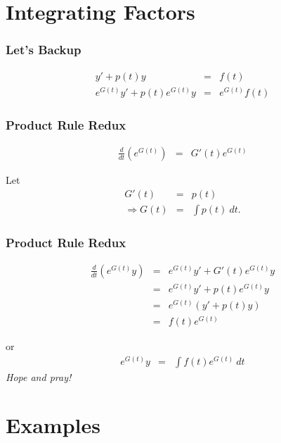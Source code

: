 \documentclass{beamer}
\newcommand{\lp}{\left(}
\newcommand{\rp}{\right)}
\begin{document}
\section{Integrating Factors}

\begin{frame}
  \frametitle{Let's Backup}

  \begin{eqnarray*}
    y' + p(t) y & = & f(t) \\
    e^{G(t)} y' + p(t) e^{G(t)} y & = & e^{G(t)} f(t)
  \end{eqnarray*}


\end{frame}



\begin{frame}
  \frametitle{Product Rule Redux}

  \begin{eqnarray*}
    \frac{d}{dt} \lp e^{G(t)} \rp & = & G'(t) e^{G(t)} 
  \end{eqnarray*}

  Let
  \begin{eqnarray*}
    G'(t) & = & p(t) \\
    \Rightarrow G(t) & = & \int p(t) ~ dt.
  \end{eqnarray*}


\end{frame}


\begin{frame}
  \frametitle{Product Rule Redux}

  \begin{eqnarray*}
    \frac{d}{dt} \lp e^{G(t)} y \rp & = & e^{G(t)} y' + G'(t) e^{G(t)} y \\
    & = & e^{G(t)} y' + p(t) e^{G(t)} y \\
    & = & e^{G(t)} \lp y' + p(t) y \rp \\
    & = & f(t) e^{G(t)}
  \end{eqnarray*}

  or
  \begin{eqnarray*}
    e^{G(t)} y & = & \int f(t) e^{G(t)} ~ dt
  \end{eqnarray*}
  \textit{Hope and pray!}

\end{frame}


\section{Examples}
\end{document}
